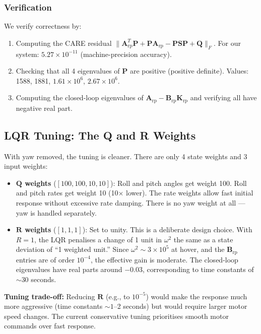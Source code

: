\documentclass[12pt, a4paper]{article}
\newcommand{\bK}{\bm{K}}
\newcommand{\bA}{\bm{A}}
\newcommand{\bB}{\bm{B}}
\newcommand{\bP}{\bm{P}}
\newcommand{\bQ}{\bm{Q}}
\newcommand{\bR}{\bm{R}}
\begin{document}
\subsubsection{Verification}

We verify correctness by:
\begin{enumerate}
    \item Computing the CARE residual $\|\bA_{\text{rp}}^T\bP + \bP\bA_{\text{rp}} - \bP\bm{S}\bP + \bQ\|_F$.  For our system: $5.27 \times 10^{-11}$ (machine-precision accuracy).
    \item Checking that all 4 eigenvalues of $\bP$ are positive (positive definite).  Values: 1588, 1881, $1.61 \times 10^6$, $2.67 \times 10^6$.
    \item Computing the closed-loop eigenvalues of $\bA_{\text{rp}} - \bB_{\text{rp}}\bK_{\text{rp}}$ and verifying all have negative real part.
\end{enumerate}

\subsection{LQR Tuning: The Q and R Weights}

With yaw removed, the tuning is cleaner.  There are only 4 state weights and 3 input weights:

\begin{itemize}
    \item \textbf{$\bQ$ weights} ($[100, 100, 10, 10]$): Roll and pitch angles get weight 100.  Roll and pitch rates get weight 10 (10$\times$ lower).  The rate weights allow fast initial response without excessive rate damping.  There is no yaw weight at all --- yaw is handled separately.

    \item \textbf{$\bR$ weights} ($[1, 1, 1]$): Set to unity.  This is a deliberate design choice.  With $R = 1$, the LQR penalises a change of 1 unit in $\omega^2$ the same as a state deviation of ``1 weighted unit.''  Since $\omega^2 \sim 3 \times 10^5$ at hover, and the $\bB_{\text{rp}}$ entries are of order $10^{-4}$, the effective gain is moderate.  The closed-loop eigenvalues have real parts around $-0.03$, corresponding to time constants of $\sim 30$ seconds.
\end{itemize}

\textbf{Tuning trade-off:} Reducing $\bR$ (e.g., to $10^{-5}$) would make the response much more aggressive (time constants $\sim 1$--2 seconds) but would require larger motor speed changes.  The current conservative tuning prioritises smooth motor commands over fast response.
\end{document}
